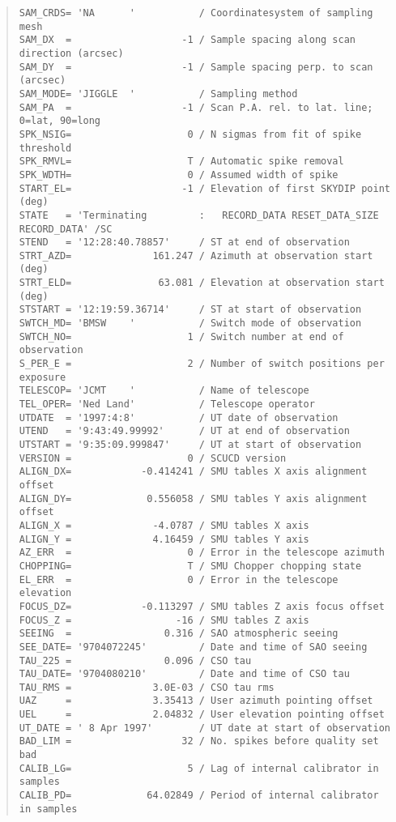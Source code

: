 \documentclass[twoside,11pt]{article}
\newenvironment{myquote}{\begin{quote}\begin{small}}{\end{small}\end{quote}}
\begin{document}
\begin{myquote}
\begin{verbatim}
SAM_CRDS= 'NA      '           / Coordinatesystem of sampling mesh
SAM_DX  =                   -1 / Sample spacing along scan direction (arcsec)
SAM_DY  =                   -1 / Sample spacing perp. to scan (arcsec)
SAM_MODE= 'JIGGLE  '           / Sampling method
SAM_PA  =                   -1 / Scan P.A. rel. to lat. line; 0=lat, 90=long
SPK_NSIG=                    0 / N sigmas from fit of spike threshold
SPK_RMVL=                    T / Automatic spike removal
SPK_WDTH=                    0 / Assumed width of spike
START_EL=                   -1 / Elevation of first SKYDIP point (deg)
STATE   = 'Terminating         :   RECORD_DATA RESET_DATA_SIZE RECORD_DATA' /SC
STEND   = '12:28:40.78857'     / ST at end of observation
STRT_AZD=              161.247 / Azimuth at observation start (deg)
STRT_ELD=               63.081 / Elevation at observation start (deg)
STSTART = '12:19:59.36714'     / ST at start of observation
SWTCH_MD= 'BMSW    '           / Switch mode of observation
SWTCH_NO=                    1 / Switch number at end of observation
S_PER_E =                    2 / Number of switch positions per exposure
TELESCOP= 'JCMT    '           / Name of telescope
TEL_OPER= 'Ned Land'           / Telescope operator
UTDATE  = '1997:4:8'           / UT date of observation
UTEND   = '9:43:49.99992'      / UT at end of observation
UTSTART = '9:35:09.999847'     / UT at start of observation
VERSION =                    0 / SCUCD version
ALIGN_DX=            -0.414241 / SMU tables X axis alignment offset
ALIGN_DY=             0.556058 / SMU tables Y axis alignment offset
ALIGN_X =              -4.0787 / SMU tables X axis
ALIGN_Y =              4.16459 / SMU tables Y axis
AZ_ERR  =                    0 / Error in the telescope azimuth
CHOPPING=                    T / SMU Chopper chopping state
EL_ERR  =                    0 / Error in the telescope elevation
FOCUS_DZ=            -0.113297 / SMU tables Z axis focus offset
FOCUS_Z =                  -16 / SMU tables Z axis
SEEING  =                0.316 / SAO atmospheric seeing
SEE_DATE= '9704072245'         / Date and time of SAO seeing
TAU_225 =                0.096 / CSO tau
TAU_DATE= '9704080210'         / Date and time of CSO tau
TAU_RMS =              3.0E-03 / CSO tau rms
UAZ     =              3.35413 / User azimuth pointing offset
UEL     =              2.04832 / User elevation pointing offset
UT_DATE = ' 8 Apr 1997'        / UT date at start of observation
BAD_LIM =                   32 / No. spikes before quality set bad
CALIB_LG=                    5 / Lag of internal calibrator in samples
CALIB_PD=             64.02849 / Period of internal calibrator in samples

\end{verbatim}
\end{myquote}
\end{document}
